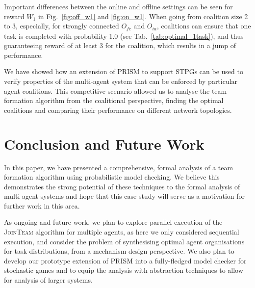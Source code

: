 \documentclass{llncs}
\begin{document}
Important differences between the online and offline settings can be seen for reward $W_1$ in Fig.~\ref{fig:off_w1} and \ref{fig:on_w1}. When going from coalition size 2 to 3, especially, for strongly connected $O_{\mathit{fc}}$ and $O_{ia}$, coalitions can ensure that one task is completed with probability 1.0 (see Tab.~\ref{tab:optimal_1task}), and thus guaranteeing reward of at least 3 for the coalition, which results in a jump of performance.


We have showed how an extension of PRISM to support STPGs can be used to verify properties of the multi-agent system that can be enforced by particular agent coalitions. This competitive  scenario allowed us to analyse the team formation algorithm from the coalitional perspective, finding the optimal coalitions and comparing their performance on different network topologies.

\vspace{-11pt}
\section{Conclusion and Future Work}
\vspace{-8pt}
In this paper, we have presented a comprehensive, formal analysis of a team formation algorithm using probabilistic model checking. We believe this demonstrates the strong potential of these techniques to the formal analysis of multi-agent systems and hope that this case study will serve as a motivation for further work in this area.

As ongoing and future work,
we plan to explore parallel execution of the \textsc{JoinTeam} algorithm for multiple agents, as here we only considered sequential execution, and consider the problem of synthesising optimal agent organisations for task distributions, from a mechanism design perspective.
We also plan to develop our prototype extension of PRISM
into a fully-fledged model checker for stochastic games
and to equip the analysis with abstraction techniques to allow for analysis of larger systems.

\end{document}
